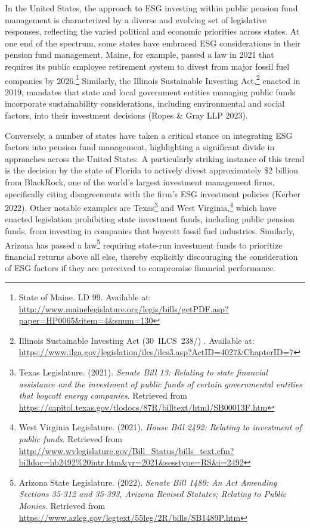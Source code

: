 \documentclass[
  12pt,
]{article}
\begin{document}
In the United States, the approach to ESG investing within public pension fund management is characterized by a diverse and evolving set of legislative responses, reflecting the varied political and economic priorities across states. At one end of the spectrum, some states have embraced ESG considerations in their pension fund management. Maine, for example, passed a law in 2021 that requires its public employee retirement system to divest from major fossil fuel companies by 2026.\footnote{State of Maine. LD 99. Available at: \url{http://www.mainelegislature.org/legis/bills/getPDF.asp?paper=HP0065\&item=4\&snum=130}} Similarly, the Illinois Sustainable Investing Act,\footnote{Illinois Sustainable Investing Act (30~ILCS~238/) . Available at: \url{https://www.ilga.gov/legislation/ilcs/ilcs3.asp?ActID=4027\&ChapterID=7}} enacted in 2019, mandates that state and local government entities managing public funds incorporate sustainability considerations, including environmental and social factors, into their investment decisions (Ropes \& Gray LLP 2023).

Conversely, a number of states have taken a critical stance on integrating ESG factors into pension fund management, highlighting a significant divide in approaches across the United States. A particularly striking instance of this trend is the decision by the state of Florida to actively divest approximately \$2 billion from BlackRock, one of the world's largest investment management firms, specifically citing disagreements with the firm's ESG investment policies (Kerber 2022). Other notable examples are Texas\footnote{Texas Legislature. (2021). \emph{Senate Bill 13: Relating to state financial assistance and the investment of public funds of certain governmental entities that boycott energy companies}. Retrieved from \url{https://capitol.texas.gov/tlodocs/87R/billtext/html/SB00013F.htm}} and West Virginia,\footnote{West Virginia Legislature. (2021). \emph{House Bill 2492: Relating to investment of public funds}. Retrieved from \url{http://www.wvlegislature.gov/Bill_Status/bills_text.cfm?billdoc=hb2492\%20intr.htm\&yr=2021\&sesstype=RS\&i=2492}} which have enacted legislation prohibiting state investment funds, including public pension funds, from investing in companies that boycott fossil fuel industries. Similarly, Arizona has passed a law\footnote{Arizona State Legislature. (2022). \emph{Senate Bill 1489: An Act Amending Sections 35-312 and 35-393, Arizona Revised Statutes; Relating to Public Monies}. Retrieved from \url{https://www.azleg.gov/legtext/55leg/2R/bills/SB1489P.htm}} requiring state-run investment funds to prioritize financial returns above all else, thereby explicitly discouraging the consideration of ESG factors if they are perceived to compromise financial performance.
\end{document}

